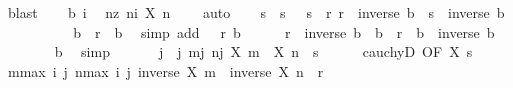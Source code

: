 \begin{isabellebody}
\ blast\isanewline
\ \ \isamarkupfalse%
\ b\ i\ \isamarkupfalse%
\ nz{\isacharcolon}{\kern0pt}\ {\isachardoublequoteopen}{\isasymforall}n{\isasymge}i{\isachardot}{\kern0pt}\ X\ n\ {\isasymnoteq}\ {}{\isachardoublequoteclose}\ \isamarkupfalse%
\ auto\isanewline
\ \ \isamarkupfalse%
\ s\ \ s{\isacharcolon}{\kern0pt}\ {\isachardoublequoteopen}{}\ {\isacharless}{\kern0pt}\ s{\isachardoublequoteclose}\ \ r{\isacharcolon}{\kern0pt}\ {\isachardoublequoteopen}r\ {\isacharequal}{\kern0pt}\ inverse\ b\ {\isacharasterisk}{\kern0pt}\ s\ {\isacharasterisk}{\kern0pt}\ inverse\ b{\isachardoublequoteclose}\isanewline
\ \ \isamarkupfalse%
\isanewline
\ \ \ \ \isamarkupfalse%
\ {\isachardoublequoteopen}{}\ {\isacharless}{\kern0pt}\ b\ {\isacharasterisk}{\kern0pt}\ r\ {\isacharasterisk}{\kern0pt}\ b{\isachardoublequoteclose}\ \isamarkupfalse%
\ {\isacharparenleft}{\kern0pt}simp\ add{\isacharcolon}{\kern0pt}\ {\isacartoucheopen}{}\ {\isacharless}{\kern0pt}\ r{\isacartoucheclose}\ b{\isacharparenright}{\kern0pt}\isanewline
\ \ \ \ \isamarkupfalse%
\ {\isachardoublequoteopen}r\ {\isacharequal}{\kern0pt}\ inverse\ b\ {\isacharasterisk}{\kern0pt}\ {\isacharparenleft}{\kern0pt}b\ {\isacharasterisk}{\kern0pt}\ r\ {\isacharasterisk}{\kern0pt}\ b{\isacharparenright}{\kern0pt}\ {\isacharasterisk}{\kern0pt}\ inverse\ b{\isachardoublequoteclose}\isanewline
\ \ \ \ \ \ \isamarkupfalse%
\ b\ \isamarkupfalse%
\ simp\isanewline
\ \ \isamarkupfalse%
\isanewline
\ \ \isamarkupfalse%
\ j\ \ j{\isacharcolon}{\kern0pt}\ {\isachardoublequoteopen}{\isasymforall}m{\isasymge}j{\isachardot}{\kern0pt}\ {\isasymforall}n{\isasymge}j{\isachardot}{\kern0pt}\ {\isasymbar}X\ m\ {\isacharminus}{\kern0pt}\ X\ n{\isasymbar}\ {\isacharless}{\kern0pt}\ s{\isachardoublequoteclose}\isanewline
\ \ \ \ \isamarkupfalse%
\ cauchyD\ {\isacharbrackleft}{\kern0pt}OF\ X\ s{\isacharbrackright}{\kern0pt}\ \isacommand{{\isachardot}{\kern0pt}{\isachardot}{\kern0pt}}\isamarkupfalse%
\isanewline
\ \ \isamarkupfalse%
\ {\isachardoublequoteopen}{\isasymforall}m{\isasymge}max\ i\ j{\isachardot}{\kern0pt}\ {\isasymforall}n{\isasymge}max\ i\ j{\isachardot}{\kern0pt}\ {\isasymbar}inverse\ {\isacharparenleft}{\kern0pt}X\ m{\isacharparenright}{\kern0pt}\ {\isacharminus}{\kern0pt}\ inverse\ {\isacharparenleft}{\kern0pt}X\ n{\isacharparenright}{\kern0pt}{\isasymbar}\ {\isacharless}{\kern0pt}\ r{\isachardoublequoteclose}\isanewline

\end{isabellebody}
